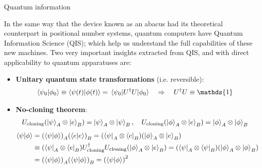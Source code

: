 \documentclass[9pt, handout, aspectratio=169]{beamer}	%
\begin{document}

\begin{frame}{Quantum information}

	In the same way that the device known as an abacus had its theoretical counterpart in positional number systems, quantum computers have Quantum Information Science (QIS); which help us understand the full capabilities of these new machines. Two very important insights extracted from QIS, and with direct applicability to quantum apparatuses are:

	\medskip

	\begin{itemize}
		\item<2-> \textbf{Unitary quantum state transformations} (i.e. reversible):\\
			\begin{gather*}
			  \braket{\psi_0}{\phi_0} \equiv \braket{\psi(t)}{\phi(t)} =
					\mel{\psi_0}{U^\dagger U}{\phi_0} \qRa U^\dagger U \equiv \mathds{1}
			\end{gather*}
		\item<3-> \textbf{No-cloning theorem}:\\
			\begin{gather*}
			  U_\text{cloning} \qty(\ket{\psi}_A \otimes \ket{e}_B) =
			    \ket{\psi}_A \otimes \ket{\psi}_B \qc
				U_\text{cloning} \qty(\ket{\phi}_A \otimes \ket{e}_B) =
			    \ket{\phi}_A \otimes \ket{\phi}_B \\
			\end{gather*}
			\vspace{-3em}
			\begin{align*}
				\braket{\psi}{\phi} &=
					\qty(\braket{\psi}{\phi})_A \qty(\braket{e}{e})_B =
					\qty(\bra{\psi}_A\otimes\bra{e}_B) \qty(\ket{\phi}_A\otimes\ket{e}_B) \\
				&\equiv \qty(\bra{\psi}_A\otimes\bra{e}_B)
						U_\text{cloning}^\dagger U_\text{cloning}
						\qty(\ket{\phi}_A\otimes\ket{e}_B) =
					\qty(\bra{\psi}_A\otimes\bra{\psi}_B)
						\qty(\ket{\phi}_A\otimes\ket{\phi}_B) \\
				&= \qty(\braket{\psi}{\phi})_A \qty(\braket{\psi}{\phi})_B =
					\qty(\braket{\psi}{\phi})^2
			\end{align*}
	\end{itemize}

\end{frame}

\end{document}
